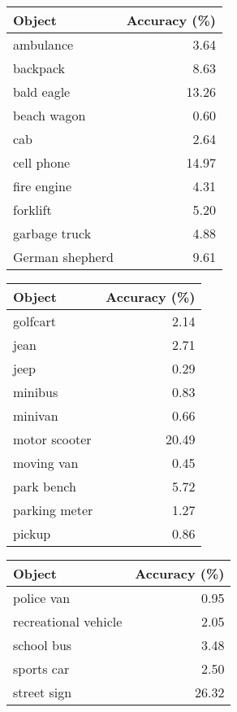 \documentclass[10pt,twocolumn,letterpaper]{article}
\begin{document}
\begin{table*}[h]
	\begin{center}
		\begin{tabular}{lr}
			\toprule
			Object          & Accuracy (\%) \\
			\midrule
			ambulance       & 3.64       \\
			backpack        & 8.63       \\
			bald eagle      & 13.26      \\
			beach wagon     & 0.60       \\
			cab             & 2.64       \\
			cell phone      & 14.97      \\
			fire engine     & 4.31       \\
			forklift        & 5.20       \\
			garbage truck   & 4.88       \\
			German shepherd & 9.61       \\
			\bottomrule
		\end{tabular}
		\begin{tabular}{lr}
			\toprule
			Object        & Accuracy (\%) \\
			\midrule
			golfcart      & 2.14       \\
			jean          & 2.71       \\
			jeep          & 0.29       \\
			minibus       & 0.83       \\
			minivan       & 0.66       \\
			motor scooter & 20.49      \\
			moving van    & 0.45       \\
			park bench    & 5.72       \\
			parking meter & 1.27       \\
			pickup        & 0.86       \\
			\bottomrule
		\end{tabular}
		\begin{tabular}{lr}
			\toprule
			Object               & Accuracy (\%) \\
			\midrule
			police van           & 0.95       \\
			recreational vehicle & 2.05       \\
			school bus           & 3.48       \\
			sports car           & 2.50       \\
			street sign          & 26.32      \\

\end{tabular}
\end{center}
\end{table*}
\end{document}
